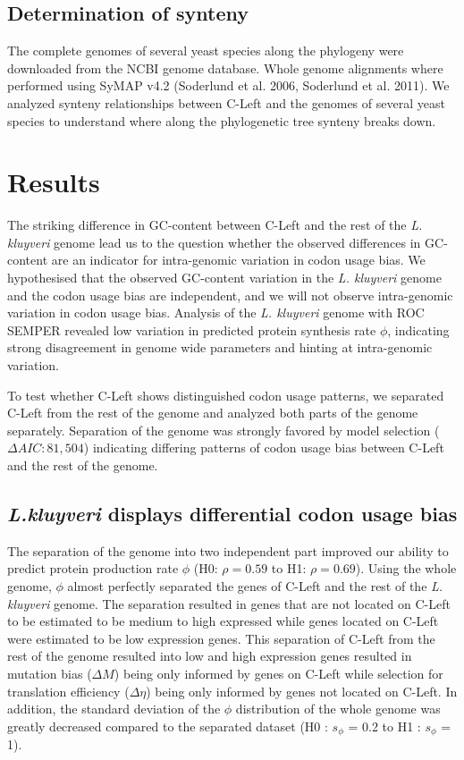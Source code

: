 \documentclass[12pt,draft]{article}
\begin{document}
\subsection{Determination of synteny}	
The complete genomes of several yeast species along the phylogeny were downloaded from the NCBI genome database.
Whole genome alignments where performed using SyMAP v4.2 (Soderlund et al. 2006, Soderlund et al. 2011).
We analyzed synteny relationships between C-Left and the genomes of several yeast species to understand where along the phylogenetic tree synteny breaks down.
  
	
\section*{Results}
The striking difference in GC-content between C-Left and the rest of the \textit{L. kluyveri} genome lead us to the question whether the observed differences in GC-content are an indicator for intra-genomic variation in codon usage bias.
We hypothesised that the observed GC-content variation in the \textit{L. kluyveri} genome and the codon usage bias are independent, and we will not observe intra-genomic variation in codon usage bias.
Analysis of the \textit{L. kluyveri} genome with ROC SEMPER revealed low variation in predicted protein synthesis rate $\phi$, indicating strong disagreement in genome wide parameters and hinting at intra-genomic variation.
  
To test whether C-Left shows distinguished codon usage patterns, we separated C-Left from the rest of the genome and analyzed both parts of the genome separately.
Separation of the genome was strongly favored by model selection ($\Delta AIC: 81,504$) indicating differing patterns of codon usage bias between C-Left and the rest of the genome.

\subsection*{\textit{L.kluyveri} displays differential codon usage bias}
The separation of the genome into two independent part improved our ability to predict protein production rate $\phi$ (H0: $\rho = 0.59$ to H1: $\rho = 0.69$).
Using the whole genome, $\phi$ almost perfectly separated the genes of C-Left and the rest of the \textit{L. kluyveri} genome. 
The separation resulted in genes that are not located on C-Left to be estimated to be medium to high expressed while genes located on C-Left were estimated to be low expression genes. 
This separation of C-Left from the rest of the genome resulted into low and high expression genes resulted in mutation bias ($\Delta M$) being only informed by genes on C-Left while selection for translation efficiency ($\Delta \eta$) being only informed by genes not located on C-Left. 
In addition, the standard deviation of the $\phi$ distribution of the whole genome was greatly decreased compared to the separated dataset (H0 : $s_{\phi}$ = 0.2 to H1 : $s_{\phi}$ = 1).
\end{document}
